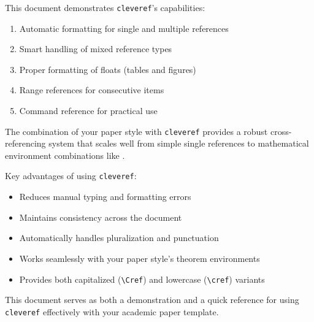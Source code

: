 \documentclass[11pt]{article}
\begin{document}
This document demonstrates \texttt{cleveref}'s capabilities:
\begin{enumerate}
\item Automatic formatting for single and multiple references
\item Smart handling of mixed reference types  
\item Proper formatting of floats (tables and figures)
\item Range references for consecutive items
\item Command reference for practical use
\end{enumerate}

The combination of your paper style with \texttt{cleveref} provides a robust cross-referencing system that scales well from simple single references to mathematical environment combinations like .

Key advantages of using \texttt{cleveref}:
\begin{itemize}
\item Reduces manual typing and formatting errors
\item Maintains consistency across the document
\item Automatically handles pluralization and punctuation
\item Works seamlessly with your paper style's theorem environments
\item Provides both capitalized (\texttt{\textbackslash Cref}) and lowercase (\texttt{\textbackslash cref}) variants
\end{itemize}

This document serves as both a demonstration and a quick reference for using \texttt{cleveref} effectively with your academic paper template.
\end{document}
